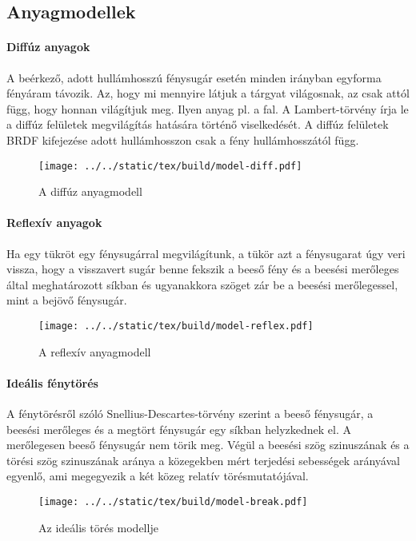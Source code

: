 \documentclass[../../main.tex]{subfiles}
\begin{document}
\subsection{Anyagmodellek}

\paragraph*{Diffúz anyagok}
A beérkező, adott hullámhosszú fénysugár esetén minden irányban egyforma
fényáram távozik. Az, hogy mi mennyire látjuk a tárgyat világosnak, az csak
attól függ, hogy honnan világítjuk meg. Ilyen anyag pl. a fal.
A Lambert-törvény írja le a diffúz felületek megvilágítás hatására történő
viselkedését. A diffúz felületek BRDF kifejezése adott hullámhosszon csak a
fény hullámhosszától függ.
\begin{figure}[H]
  \centering
  \texttt{[image: ../../static/tex/build/model-diff.pdf]}
  \caption{A diffúz anyagmodell}
  \label{fig:model-diff}
\end{figure}

\paragraph*{Reflexív anyagok}
Ha egy tükröt egy fénysugárral megvilágítunk, a tükör azt a fénysugarat úgy
veri vissza, hogy a visszavert sugár benne fekszik a beeső fény és a beesési
merőleges által meghatározott síkban és ugyanakkora szöget zár be a beesési
merőlegessel, mint a bejövő fénysugár.
\begin{figure}[H]
  \centering
  \texttt{[image: ../../static/tex/build/model-reflex.pdf]}
  \caption{A reflexív anyagmodell}
  \label{fig:model-reflex}
\end{figure}

\paragraph*{Ideális fénytörés}
A fénytörésről szóló Snellius-Descartes-törvény szerint a beeső fénysugár,
a beesési merőleges és a megtört fénysugár egy síkban helyzkednek el.
A merőlegesen beeső fénysugár nem törik meg.
Végül a beesési szög szinuszának és a törési szög szinuszának aránya a
közegekben mért terjedési sebességek arányával egyenlő, ami megegyezik a két
közeg relatív törésmutatójával.
\begin{figure}[H]
  \centering
  \texttt{[image: ../../static/tex/build/model-break.pdf]}
  \caption{Az ideális törés modellje}
  \label{fig:model-break}
\end{figure}
\end{document}
